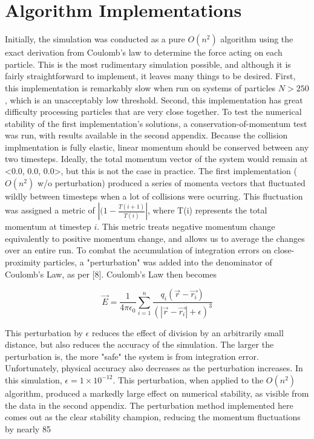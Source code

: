 \documentclass[10pt]{article}
\begin{document}
\section{Algorithm Implementations}
Initially, the simulation was conducted as a pure $O(n^2)$ algorithm using the exact derivation from Coulomb's law to determine the force acting on each particle. This is the most rudimentary simulation possible, and although it is fairly straightforward to implement, it leaves many things to be desired. First, this implementation is remarkably slow when run on systems of particles $N > 250$, which is an unacceptably low threshold. Second, this implementation has great difficulty processing particles that are very close together. To test the numerical stability of the first implementation's solutions, a conservation-of-momentum test was run, with results available in the second appendix. Because the collision implmentation is fully elastic, linear momentum should be conserved between any two timesteps. Ideally, the total momentum vector of the system would remain at <0.0, 0.0, 0.0>, but this is not the case in practice. The first implementation ($O(n^2)$ w/o perturbation) produced a series of momenta vectors that fluctuated wildly between timesteps when a lot of collisions were ocurring. This fluctuation was assigned a metric of $|(1 - \frac{T(i+1)}{T(i)}|$, where T(i) represents the total momentum at timestep $i$. This metric treats negative momentum change equivalently to positive momentum change, and allows us to average the changes over an entire run. To combat the accumulation of integration errors on close-proximity particles, a "perturbation" was added into the denominator of Coulomb's Law, as per [8]. Coulomb's Law then becomes

$$\vec{E} = \frac{1}{4\pi\epsilon_0}\sum_{i = 1}^n \frac{q_i (\vec{r} - \vec{r_i})}{(|\vec{r} - \vec{r_i}| + \epsilon)^3}$$ 

This perturbation by $\epsilon$ reduces the effect of division by an arbitrarily small distance, but also reduces the accuracy of the simulation. The larger the perturbation is, the more "safe" the system is from integration error. Unfortunately, physical accuracy also decreases as the perturbation increases. In this simulation, $\epsilon = 1 \times 10^{-12}$. This perturbation, when applied to the $O(n^2)$ algorithm, produced a markedly large effect on numerical stability, as visible from the data in the second appendix. The perturbation method implemented here comes out as the clear stability champion, reducing the momentum fluctuations by nearly 85%
\end{document}
